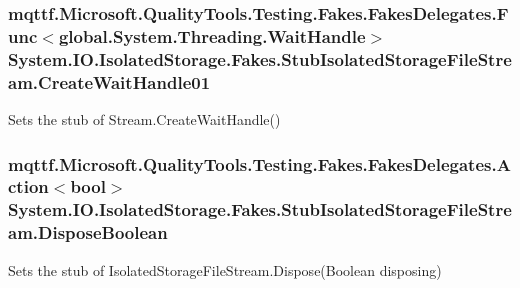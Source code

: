 \hypertarget{class_system_1_1_i_o_1_1_isolated_storage_1_1_fakes_1_1_stub_isolated_storage_file_stream_a35643dbf24ef56c6371a9506248a1dd8}{
\subsubsection[{Create\-Wait\-Handle01}]{\setlength{\rightskip}{0pt plus 5cm}mqttf.\-Microsoft.\-Quality\-Tools.\-Testing.\-Fakes.\-Fakes\-Delegates.\-Func$<$global.\-System.\-Threading.\-Wait\-Handle$>$ System.\-I\-O.\-Isolated\-Storage.\-Fakes.\-Stub\-Isolated\-Storage\-File\-Stream.\-Create\-Wait\-Handle01}}\label{class_system_1_1_i_o_1_1_isolated_storage_1_1_fakes_1_1_stub_isolated_storage_file_stream_a35643dbf24ef56c6371a9506248a1dd8}


Sets the stub of Stream.\-Create\-Wait\-Handle()

\hypertarget{class_system_1_1_i_o_1_1_isolated_storage_1_1_fakes_1_1_stub_isolated_storage_file_stream_ae9b27c3d8b8d7dc73252a2841a09bb8d}{
\subsubsection[{Dispose\-Boolean}]{\setlength{\rightskip}{0pt plus 5cm}mqttf.\-Microsoft.\-Quality\-Tools.\-Testing.\-Fakes.\-Fakes\-Delegates.\-Action$<$bool$>$ System.\-I\-O.\-Isolated\-Storage.\-Fakes.\-Stub\-Isolated\-Storage\-File\-Stream.\-Dispose\-Boolean}}\label{class_system_1_1_i_o_1_1_isolated_storage_1_1_fakes_1_1_stub_isolated_storage_file_stream_ae9b27c3d8b8d7dc73252a2841a09bb8d}


Sets the stub of Isolated\-Storage\-File\-Stream.\-Dispose(\-Boolean disposing)


